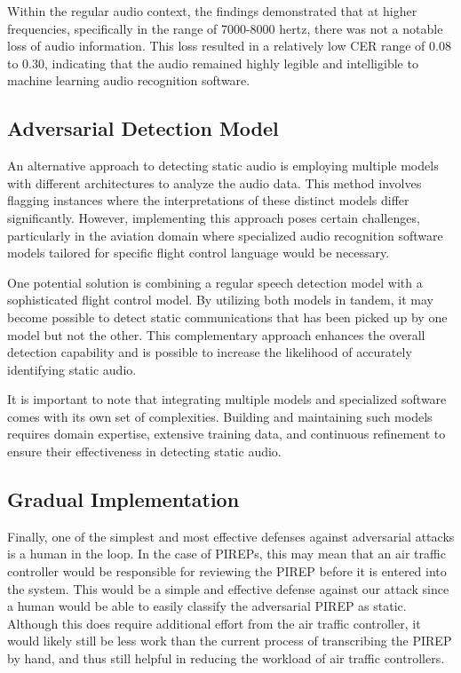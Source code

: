 \documentclass[11pt,a4paper]{article}
\begin{document}
Within the regular audio context, the findings demonstrated that at higher
frequencies, specifically in the range of 7000-8000 hertz, there was not a
notable loss of audio information. This loss resulted in a relatively low CER
range of 0.08 to 0.30, indicating that the audio remained highly legible and
intelligible to machine learning audio recognition software.

\subsection{Adversarial Detection Model}

An alternative approach to detecting static audio is employing multiple models
with different architectures to analyze the audio data. This method involves
flagging instances where the interpretations of these distinct models differ
significantly. However, implementing this approach poses certain challenges,
particularly in the aviation domain where specialized audio recognition software
models tailored for specific flight control language would be necessary.

One potential solution is combining a regular speech detection model with a
sophisticated flight control model. By utilizing both models in tandem, it may
become possible to detect static communications that has been picked up by one
model but not the other. This complementary approach enhances the overall
detection capability and is possible to increase the likelihood of accurately
identifying static audio.

It is important to note that integrating multiple models and specialized
software comes with its own set of complexities. Building and maintaining such
models requires domain expertise, extensive training data, and continuous
refinement to ensure their effectiveness in detecting static audio.

\subsection{Gradual Implementation}

Finally, one of the simplest and most effective defenses against adversarial
attacks is a human in the loop. In the case of PIREPs, this may mean that an air
traffic controller would be responsible for reviewing the PIREP before it is
entered into the system. This would be a simple and effective defense against
our attack since a human would be able to easily classify the adversarial PIREP
as static. Although this does require additional effort from the air traffic
controller, it would likely still be less work than the current process of
transcribing the PIREP by hand, and thus still helpful in reducing the workload
of air traffic controllers.
\end{document}
